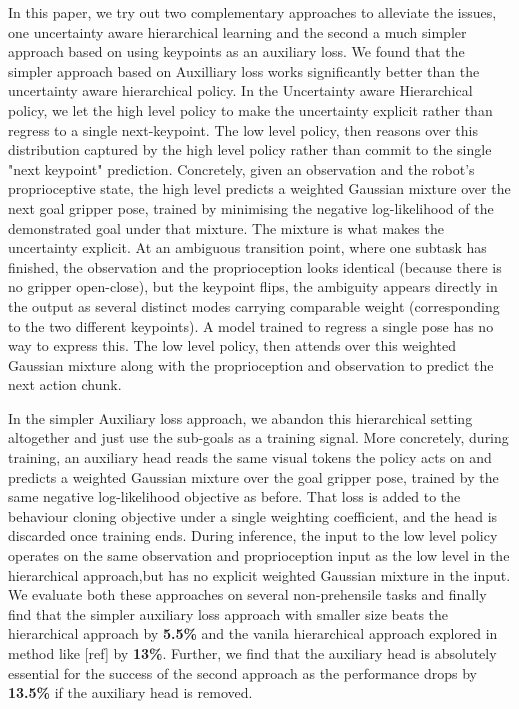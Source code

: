 \documentclass[letterpaper, 10 pt, conference]{ieeeconf}  %
\begin{document}
In this paper, we try out two complementary approaches to alleviate the issues, one uncertainty aware hierarchical learning and the second a much simpler approach based on using keypoints as an auxiliary loss. We found that the simpler approach based on Auxilliary loss works significantly better than the uncertainty aware hierarchical policy. In the Uncertainty aware Hierarchical policy, we let the high level policy to make the uncertainty explicit rather than regress to a single next-keypoint. The low level policy, then reasons over this distribution captured by the high level policy rather than commit to the single "next keypoint" prediction. Concretely, given an observation and the robot's proprioceptive state, the high level predicts a weighted Gaussian mixture over the next goal gripper pose, trained by minimising the negative log-likelihood of the demonstrated goal under that mixture. The mixture is what makes the uncertainty explicit. At an ambiguous transition point, where one subtask has finished, the observation and the proprioception looks identical (because there is no gripper open-close), but the keypoint flips, the ambiguity appears directly in the output as several distinct modes carrying comparable weight (corresponding to the two different keypoints). A model trained to regress a single pose has no way to express this. The low level policy, then attends over this weighted Gaussian mixture along with the proprioception and observation to predict the next action chunk. 

In the simpler Auxiliary loss approach, we abandon this hierarchical setting altogether and just use the sub-goals as a training signal. More concretely, during training, an auxiliary head reads the same visual tokens the policy acts on and predicts a weighted Gaussian mixture over the goal gripper pose, trained by the same negative log-likelihood objective as before. That loss is added to the behaviour cloning objective under a single weighting coefficient, and the head is discarded once training ends. During inference, the input to the low level policy operates on the same observation and proprioception input as the low level in the hierarchical approach,but has no explicit weighted Gaussian mixture in the input. We evaluate both these approaches on several non-prehensile tasks and finally find that the simpler auxiliary loss approach with smaller size beats the hierarchical approach by \textbf{5.5\%} and the vanila hierarchical approach explored in method like [ref] by \textbf{13\%}. Further, we find that the auxiliary head is absolutely essential for the success of the second approach as the performance drops by \textbf{13.5\%} if the auxiliary head is removed.
\end{document}
